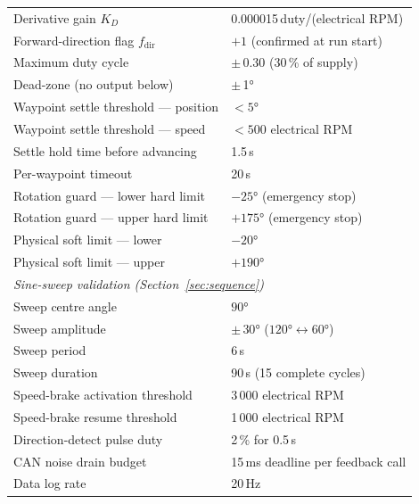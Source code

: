 \documentclass[12pt,a4paper]{article}
\begin{document}
\begin{table}[H]
\begin{tabular}{ll}
    Derivative gain $K_D$                          & 0.000015\,duty/(electrical RPM) \\
    Forward-direction flag $f_{\text{dir}}$         & $+1$ (confirmed at run start) \\
    Maximum duty cycle                             & $\pm$\,0.30 (30\,\% of supply) \\
    Dead-zone (no output below)                    & $\pm$\,1° \\
    Waypoint settle threshold --- position         & $<5°$ \\
    Waypoint settle threshold --- speed            & $<500$ electrical RPM \\
    Settle hold time before advancing              & 1.5\,s \\
    Per-waypoint timeout                           & 20\,s \\
    Rotation guard --- lower hard limit            & $-25°$ (emergency stop) \\
    Rotation guard --- upper hard limit            & $+175°$ (emergency stop) \\
    Physical soft limit --- lower                  & $-20°$ \\
    Physical soft limit --- upper                  & $+190°$ \\
    \midrule
    \multicolumn{2}{l}{\textit{Sine-sweep validation (Section~\ref{sec:sequence})}} \\
    \midrule
    Sweep centre angle                             & $90°$ \\
    Sweep amplitude                                & $\pm\,30°$ ($120° \leftrightarrow 60°$) \\
    Sweep period                                   & 6\,s \\
    Sweep duration                                 & 90\,s (15 complete cycles) \\
    Speed-brake activation threshold               & 3\,000 electrical RPM \\
    Speed-brake resume threshold                   & 1\,000 electrical RPM \\
    Direction-detect pulse duty                    & 2\,\% for 0.5\,s \\
    CAN noise drain budget                         & 15\,ms deadline per feedback call \\
    Data log rate                                  & 20\,Hz \\
    \bottomrule
  \end{tabular}
\end{table}
\end{document}
